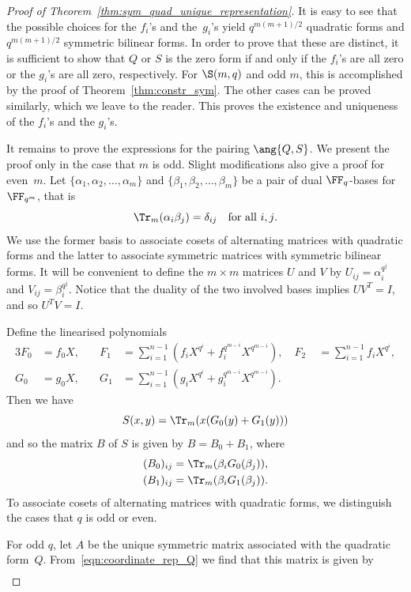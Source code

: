 \begin{proof}[Proof of Theorem~\ref{thm:sym_quad_unique_representation}]
It is easy to see that the possible choices for the $f_i$'s and the~$g_i$'s yield $q^{m(m+1)/2}$ quadratic forms and $q^{m(m+1)/2}$ symmetric bilinear forms. In order to prove that these are distinct, it is sufficient to show that $Q$ or $S$ is the zero form if and only if the $f_i$'s are all zero or the $g_i$'s are all zero, respectively. For $\S(m,q)$ and odd $m$, this is accomplished by the proof of Theorem~\ref{thm:constr_sym}. The other cases can be proved similarly, which we leave to the reader. This proves the existence and uniqueness of the $f_i$'s and the $g_i$'s.
\par
It remains to prove the expressions for the pairing $\ang{Q,S}$. We present the proof only in the case that $m$ is odd. Slight modifications also give a proof for even~$m$. Let $\{\alpha_1,\alpha_2,\dots,\alpha_m\}$ and $\{\beta_1,\beta_2,\dots,\beta_m\}$ be a pair of dual $\FF_q$-bases for $\FF_{q^m}$, that is
\[
\Tr_m(\alpha_i\beta_j)=\delta_{ij}\quad\text{for all $i,j$}.
\]
We use the former basis to associate cosets of alternating matrices with quadratic forms and the latter to associate symmetric matrices with symmetric bilinear forms. It will be convenient to define the $m\times m$ matrices $U$ and $V$ by $U_{ij}=\alpha_i^{q^j}$ and $V_{ij}=\beta_i^{q^j}$. Notice that the duality of the two involved bases implies $UV^T=I$, and so $U^TV=I$. 
\par
Define the linearised polynomials
\begin{alignat*}{3}
F_0&=f_0X, \quad & F_1&=\sum_{i=1}^{n-1}(f_iX^{q^i}+f_i^{q^{m-i}}X^{q^{m-i}}),\quad  F_2&\;=\sum_{i=1}^{n-1}f_iX^{q^i},\\
G_0&=g_0X, \quad & G_1&=\sum_{i=1}^{n-1}(g_iX^{q^i}+g_i^{q^{m-i}}X^{q^{m-i}}).
\end{alignat*}
Then we have
\[
S(x,y)=\Tr_m(x(G_0(y)+G_1(y)))
\]
and so the matrix $B$ of $S$ is given by $B=B_0+B_1$, where
\begin{align*}
(B_0)_{ij}&=\Tr_m(\beta_iG_0(\beta_j)),\\
(B_1)_{ij}&=\Tr_m(\beta_iG_1(\beta_j)).
\end{align*}
To associate cosets of alternating matrices with quadratic forms, we distinguish the cases that $q$ is odd or even.
\par
For odd $q$, let $A$ be the unique symmetric matrix associated with the quadratic form~$Q$. From~\eqref{eqn:coordinate_rep_Q} we find that this matrix is given by 
\begin{align*}

\end{align*}
\end{proof}
